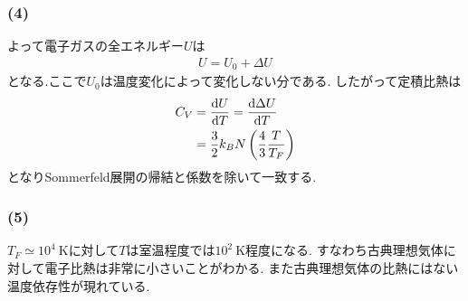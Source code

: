 \documentclass[uplatex,a4j,11pt,dvipdfmx]{jsarticle}
\begin{document}
\subsubsection*{(4)}
よって電子ガスの全エネルギー$U$は
\begin{align}
  U=U_0+\Delta U
\end{align}
となる.ここで$U_0$は温度変化によって変化しない分である.
したがって定積比熱は
\begin{align}
  \begin{split}
    C_V&=\frac{{\rm d}U}{{\rm d}T}=\frac{{\rm d}\Delta U}{{\rm d}T}\\
    &=\frac{3}{2}k_BN\left(\frac{4}{3}\frac{T}{T_F}\right)
  \end{split}
\end{align}
となりSommerfeld展開の帰結と係数を除いて一致する.
\subsubsection*{(5)}
$T_F\simeq10^4\ \si{\kelvin}$に対して$T$は室温程度では$10^2\ \si{\kelvin}$程度になる.
すなわち古典理想気体に対して電子比熱は非常に小さいことがわかる.
また古典理想気体の比熱にはない温度依存性が現れている.
\end{document}
